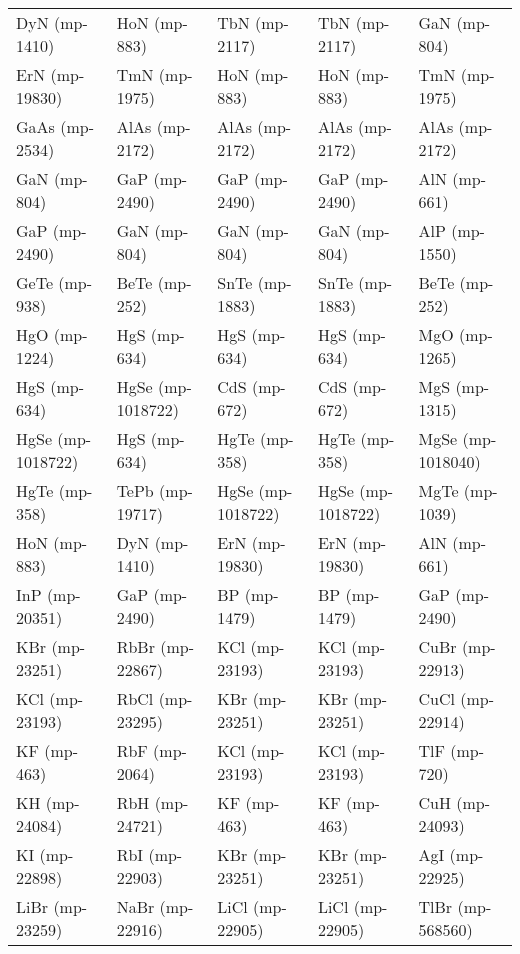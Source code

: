\begin{longtable}{lllll}
    DyN (mp-1410) &      HoN (mp-883) &       TbN (mp-2117) &     TbN (mp-2117) &        GaN (mp-804) \\
   ErN (mp-19830) &     TmN (mp-1975) &        HoN (mp-883) &      HoN (mp-883) &       TmN (mp-1975) \\
   GaAs (mp-2534) &    AlAs (mp-2172) &      AlAs (mp-2172) &    AlAs (mp-2172) &      AlAs (mp-2172) \\
     GaN (mp-804) &     GaP (mp-2490) &       GaP (mp-2490) &     GaP (mp-2490) &        AlN (mp-661) \\
    GaP (mp-2490) &      GaN (mp-804) &        GaN (mp-804) &      GaN (mp-804) &       AlP (mp-1550) \\
    GeTe (mp-938) &     BeTe (mp-252) &      SnTe (mp-1883) &    SnTe (mp-1883) &       BeTe (mp-252) \\
    HgO (mp-1224) &      HgS (mp-634) &        HgS (mp-634) &      HgS (mp-634) &       MgO (mp-1265) \\
     HgS (mp-634) & HgSe (mp-1018722) &        CdS (mp-672) &      CdS (mp-672) &       MgS (mp-1315) \\
HgSe (mp-1018722) &      HgS (mp-634) &       HgTe (mp-358) &     HgTe (mp-358) &   MgSe (mp-1018040) \\
    HgTe (mp-358) &   TePb (mp-19717) &   HgSe (mp-1018722) & HgSe (mp-1018722) &      MgTe (mp-1039) \\
     HoN (mp-883) &     DyN (mp-1410) &      ErN (mp-19830) &    ErN (mp-19830) &        AlN (mp-661) \\
   InP (mp-20351) &     GaP (mp-2490) &        BP (mp-1479) &      BP (mp-1479) &       GaP (mp-2490) \\
   KBr (mp-23251) &   RbBr (mp-22867) &      KCl (mp-23193) &    KCl (mp-23193) &     CuBr (mp-22913) \\
   KCl (mp-23193) &   RbCl (mp-23295) &      KBr (mp-23251) &    KBr (mp-23251) &     CuCl (mp-22914) \\
      KF (mp-463) &     RbF (mp-2064) &      KCl (mp-23193) &    KCl (mp-23193) &        TlF (mp-720) \\
    KH (mp-24084) &    RbH (mp-24721) &         KF (mp-463) &       KF (mp-463) &      CuH (mp-24093) \\
    KI (mp-22898) &    RbI (mp-22903) &      KBr (mp-23251) &    KBr (mp-23251) &      AgI (mp-22925) \\
  LiBr (mp-23259) &   NaBr (mp-22916) &     LiCl (mp-22905) &   LiCl (mp-22905) &    TlBr (mp-568560) \\

\end{longtable}
